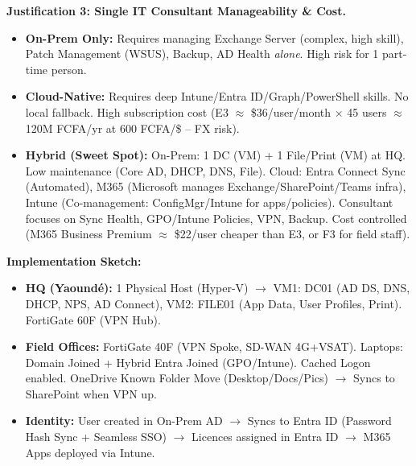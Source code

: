 \documentclass[11pt]{article}
\begin{document}
\begin{exoresolu}
\noindent\textbf{Justification 3: Single IT Consultant Manageability \& Cost.}
\begin{itemize}
    \item \textbf{On-Prem Only:} Requires managing Exchange Server (complex, high skill), Patch Management (WSUS), Backup, AD Health \emph{alone}. High risk for 1 part-time person.
    \item \textbf{Cloud-Native:} Requires deep Intune/Entra ID/Graph/PowerShell skills. No local fallback. High subscription cost (E3 $\approx$ \$36/user/month $\times$ 45 users $\approx$ 120M FCFA/yr at 600 FCFA/\$ -- FX risk).
    \item \textbf{Hybrid (Sweet Spot):} On-Prem: 1 DC (VM) + 1 File/Print (VM) at HQ. Low maintenance (Core AD, DHCP, DNS, File). Cloud: Entra Connect Sync (Automated), M365 (Microsoft manages Exchange/SharePoint/Teams infra), Intune (Co-management: ConfigMgr/Intune for apps/policies). Consultant focuses on Sync Health, GPO/Intune Policies, VPN, Backup. Cost controlled (M365 Business Premium $\approx$ \$22/user cheaper than E3, or F3 for field staff).
\end{itemize}

\noindent\textbf{Implementation Sketch:}
\begin{itemize}
    \item \textbf{HQ (Yaoundé):} 1 Physical Host (Hyper-V) $\rightarrow$ VM1: DC01 (AD DS, DNS, DHCP, NPS, AD Connect), VM2: FILE01 (App Data, User Profiles, Print). FortiGate 60F (VPN Hub).
    \item \textbf{Field Offices:} FortiGate 40F (VPN Spoke, SD-WAN 4G+VSAT). Laptops: Domain Joined + Hybrid Entra Joined (GPO/Intune). Cached Logon enabled. OneDrive Known Folder Move (Desktop/Docs/Pics) $\rightarrow$ Syncs to SharePoint when VPN up.
    \item \textbf{Identity:} User created in On-Prem AD $\rightarrow$ Syncs to Entra ID (Password Hash Sync + Seamless SSO) $\rightarrow$ Licences assigned in Entra ID $\rightarrow$ M365 Apps deployed via Intune.
\end{itemize}
\end{exoresolu}
\end{document}
